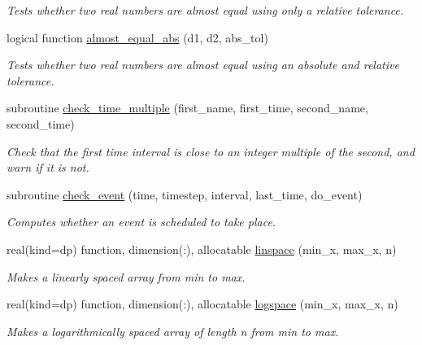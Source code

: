 \begin{DoxyCompactItemize}
\begin{DoxyCompactList}\small\item\em Tests whether two real numbers are almost equal using only a relative tolerance. \end{DoxyCompactList}\item 
logical function \mbox{\hyperlink{namespacepmc__util_a5952e4909aad7ccdcdc8ac308c7bf3f8}{almost\+\_\+equal\+\_\+abs}} (d1, d2, abs\+\_\+tol)
\begin{DoxyCompactList}\small\item\em Tests whether two real numbers are almost equal using an absolute and relative tolerance. \end{DoxyCompactList}\item 
subroutine \mbox{\hyperlink{namespacepmc__util_a479916629132db9682beccf0d90a0113}{check\+\_\+time\+\_\+multiple}} (first\+\_\+name, first\+\_\+time, second\+\_\+name, second\+\_\+time)
\begin{DoxyCompactList}\small\item\em Check that the first time interval is close to an integer multiple of the second, and warn if it is not. \end{DoxyCompactList}\item 
subroutine \mbox{\hyperlink{namespacepmc__util_a2c1ad3f0be48f08a1b308538f8d42540}{check\+\_\+event}} (time, timestep, interval, last\+\_\+time, do\+\_\+event)
\begin{DoxyCompactList}\small\item\em Computes whether an event is scheduled to take place. \end{DoxyCompactList}\item 
real(kind=dp) function, dimension(\+:), allocatable \mbox{\hyperlink{namespacepmc__util_a173493cd6763f490fd73dcc0d3ae701b}{linspace}} (min\+\_\+x, max\+\_\+x, n)
\begin{DoxyCompactList}\small\item\em Makes a linearly spaced array from min to max. \end{DoxyCompactList}\item 
real(kind=dp) function, dimension(\+:), allocatable \mbox{\hyperlink{namespacepmc__util_aaa2f79250374df571d379d895ceb7a71}{logspace}} (min\+\_\+x, max\+\_\+x, n)
\begin{DoxyCompactList}\small\item\em Makes a logarithmically spaced array of length n from min to max. \end{DoxyCompactList}\item 

\end{DoxyCompactItemize}
